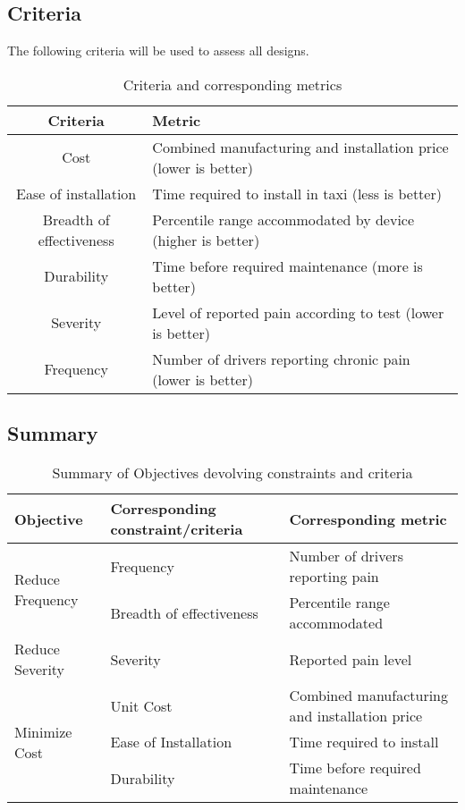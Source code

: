 \documentclass[11pt]{article}
\begin{document}
\subsection{Criteria}
The following criteria will be used to assess all designs.
\begin{table}[h]
\centering
\caption{Criteria and corresponding metrics}
\begin{tabular}{c p{10cm} }
  Criteria & Metric \\ \hline
  Cost & Combined manufacturing and installation price (lower is better) \\
  Ease of installation & Time required to install in taxi (less is better) \\
  Breadth of effectiveness & Percentile range accommodated by device (higher is better) \\
  Durability & Time before required maintenance (more is better) \\
  Severity & Level of reported pain according to test (lower is better) \\
  Frequency & Number of drivers reporting chronic pain (lower is better)
\end{tabular}
\end{table}

\subsection{Summary}

\begin{table}[h!]
\centering
\caption{Summary of Objectives devolving constraints and criteria}
\begin{tabular}{l l p{5cm}}
Objective & Corresponding constraint/criteria & Corresponding metric \\ \hline
\multirow{2}{*}{Reduce Frequency} & Frequency & Number of drivers reporting pain \\
& Breadth of effectiveness & Percentile range accommodated \\
Reduce Severity & Severity & Reported pain level \\
\multirow{3}{*}{Minimize Cost} & Unit Cost & Combined manufacturing and installation price \\
& Ease of Installation & Time required to install \\
& Durability & Time before required maintenance \\
\end{tabular}
\end{table}


\end{document}
